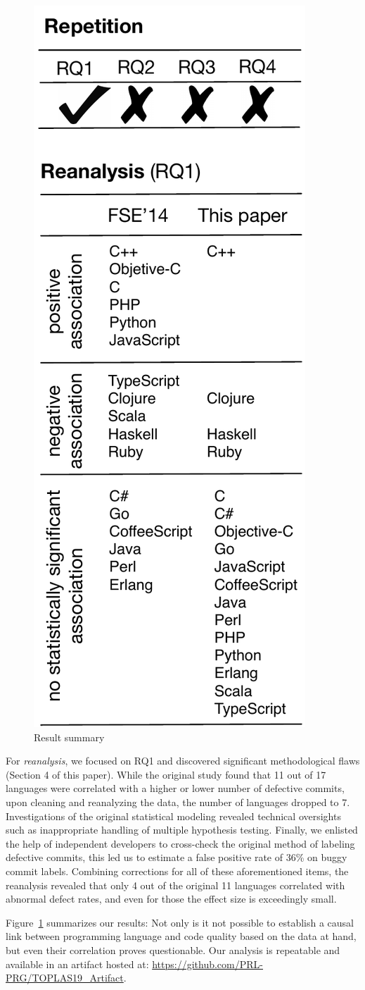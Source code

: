 \documentclass[acmsmall]{acmart}
\begin{document}
\begin{figure}\begin{center}\vspace{-3mm}
\includegraphics[width=.3\columnwidth]{Pictures/summary}\end{center}
\caption{Result summary}\label{sum}
\vspace{-5mm}
\end{figure}
\noindent  
For \emph{reanalysis}, we focused on RQ1 and discovered significant
methodological flaws (Section 4 of this paper).  While the original study
found that 11 out of 17 languages were correlated with a higher or lower
number of defective commits, upon cleaning and reanalyzing the data, the
number of languages dropped to 7. Investigations of the original statistical
modeling revealed technical oversights such as inappropriate handling of
multiple hypothesis testing. Finally, we enlisted the help of independent
developers to cross-check the original method of labeling defective commits,
this led us to estimate a false positive rate of 36\% on buggy commit
labels. Combining corrections for all of these aforementioned items, the
reanalysis revealed that only 4 out of the original 11 languages correlated
with abnormal defect rates, and even for those the effect size is
exceedingly small.

Figure~\ref{sum} summarizes our results: Not only is it not possible to
establish a causal link between programming language and code quality based
on the data at hand, but even their correlation proves questionable.  Our
analysis is repeatable and available in an artifact hosted at:
{\small\url{https://github.com/PRL-PRG/TOPLAS19_Artifact}}.
\end{document}
